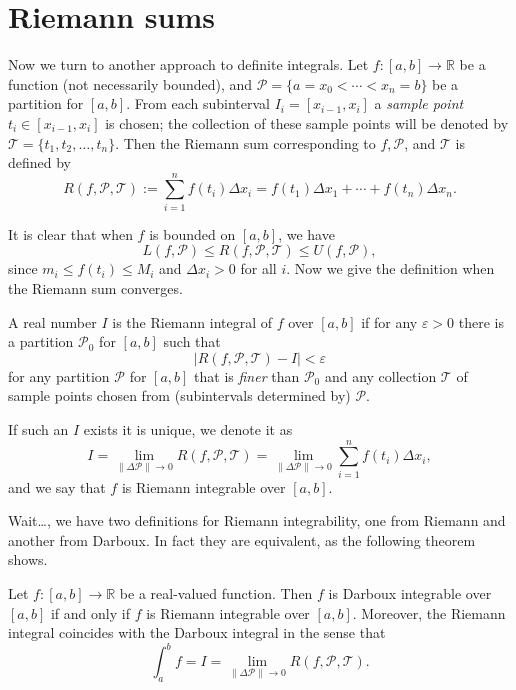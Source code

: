 \section{Riemann sums}
\label{sec:Riemann-sum}

Now we turn to another approach to definite integrals.
Let $f : [a,b] \to \mathbb{R}$ be a function (not necessarily bounded), and $\mathcal{P} = \{ a = x_0 < \cdots < x_n = b \}$ be a partition for $[a,b]$.
From each subinterval $I_i = [ x_{i-1}, x_i ]$ a \textit{sample point} $t_i \in [x_{i-1},x_i]$ is chosen; the collection of these sample points will be denoted by $\mathcal{T} = \{ t_1, t_2, \dots, t_n \}$.
Then the \textsf{Riemann sum} corresponding to $f, \mathcal{P}$, and $\mathcal{T}$ is defined by
\begin{equation*}
  R(f,\mathcal{P},\mathcal{T}) := \sum_{i=1}^n f(t_i) \Delta x_i = f(t_1) \Delta x_1 + \cdots + f(t_n) \Delta x_n.
\end{equation*}

It is clear that when $f$ is bounded on $[a,b]$, we have
\begin{equation}
  \label{eq:dar-rie-dar}
  L(f,\mathcal{P}) \leqslant R(f,\mathcal{P},\mathcal{T}) \leqslant U(f,\mathcal{P}),
\end{equation}
since $m_i \leqslant f(t_i) \leqslant M_i$ and $\Delta x_i > 0$ for all $i$.
Now we give the definition when the Riemann sum converges.

\begin{defn}
  A real number $I$ is the \textsf{Riemann integral} of $f$ over $[a,b]$ if for any $\varepsilon > 0$ there is a partition $\mathcal{P}_0$ for $[a,b]$ such that
  \[
    | R(f,\mathcal{P},\mathcal{T}) - I | < \varepsilon
  \]
  for any partition $\mathcal{P}$ for $[a,b]$ that is \textit{finer} than $\mathcal{P}_0$ and any collection $\mathcal{T}$ of sample points chosen from (subintervals determined by) $\mathcal{P}$.

  If such an $I$ exists it is unique, we denote it as
  \[
    I = \lim_{\|\Delta\mathcal{P}\| \to 0} R(f,\mathcal{P},\mathcal{T}) = \lim_{\| \Delta\mathcal{P} \| \to 0} \sum_{i=1}^n f(t_i) \Delta x_i,
  \]
  and we say that $f$ is \textsf{Riemann integrable} over $[a,b]$.
\end{defn}

Wait\dots, we have two definitions for Riemann integrability, one from Riemann and another from Darboux.
In fact they are equivalent, as the following theorem shows.

\begin{thm}
  Let $f: [a,b] \to \mathbb{R}$ be a real-valued function.  Then $f$ is Darboux integrable over $[a,b]$ if and only if $f$ is Riemann integrable over $[a,b]$.  Moreover, the Riemann integral coincides with the Darboux integral in the sense that
  \[
    \int_a^b f = I = \lim_{\| \Delta\mathcal{P} \| \to 0} R(f,\mathcal{P},\mathcal{T}).
  \]
\end{thm}

